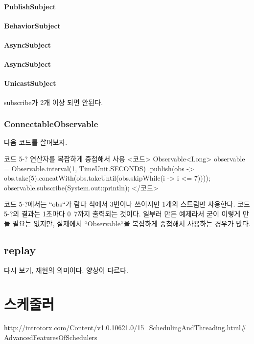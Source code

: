 \documentclass{book}
\begin{document}
{\subsubsection{PublishSubject}

\subsubsection{BehaviorSubject}

\subsubsection{AsyncSubject}

\subsubsection{AsyncSubject}

\subsubsection{UnicastSubject}
subscribe가 2개 이상 되면 안된다.

\subsection{ConnectableObservable}


다음 코드를 살펴보자.

코드 5-? 연산자를 복잡하게 중첩해서 사용
<코드>
Observable<Long> observable = Observable.interval(1, TimeUnit.SECONDS)
   .publish(obs -> obs.take(5).concatWith(obs.takeUntil(obs.skipWhile(i -> i <= 7))));
observable.subscribe(System.out::println);
</코드>

코드 5-?에서는 ``obs``가 람다 식에서 3번이나 쓰이지만 1개의 스트림만 사용한다. 코드 5-?의 결과는  1초마다 0~7까지 출력되는 것이다. 일부러 만든 예제라서 굳이 이렇게 만들 필요는 없지만, 실제에서 ``Observable``을 복잡하게 중첩해서 사용하는 경우가 많다.


\section{replay}
다시 보기, 재현의 의미이다. 양상이 다르다.

\chapter{스케줄러}
http://introtorx.com/Content/v1.0.10621.0/15_SchedulingAndThreading.html#AdvancedFeaturesOfSchedulers

}
\end{document}
